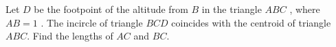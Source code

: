 Let $D$ be the footpoint of the altitude from $B$ in the triangle $ABC$ , where $AB=1$ . The incircle of triangle $BCD$ coincides with the centroid of triangle $ABC$. Find the lengths of $AC$ and $BC$.